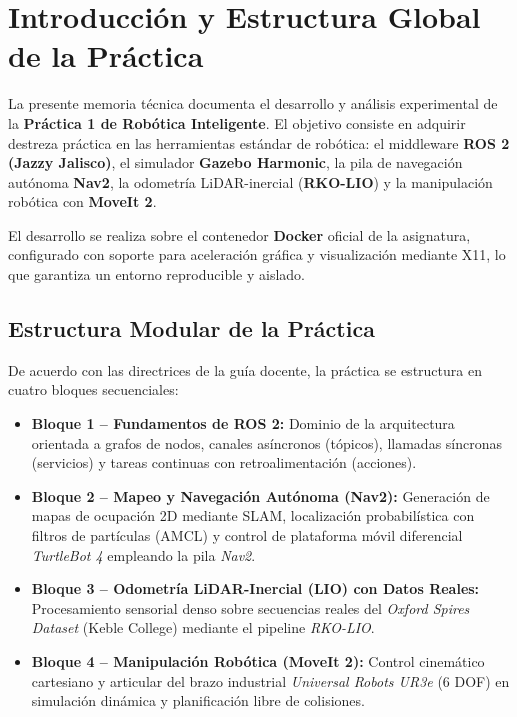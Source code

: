 \documentclass[11pt,a4paper]{article}
\begin{document}
\newpage
{}
\tableofcontents
\newpage
{}

\section{Introducción y Estructura Global de la Práctica}

La presente memoria técnica documenta el desarrollo y análisis experimental de la \textbf{Práctica 1 de Robótica Inteligente}. El objetivo consiste en adquirir destreza práctica en las herramientas estándar de robótica: el middleware \textbf{ROS 2 (Jazzy Jalisco)}, el simulador \textbf{Gazebo Harmonic}, la pila de navegación autónoma \textbf{Nav2}, la odometría LiDAR-inercial (\textbf{RKO-LIO}) y la manipulación robótica con \textbf{MoveIt 2}.

El desarrollo se realiza sobre el contenedor \textbf{Docker} oficial de la asignatura, configurado con soporte para aceleración gráfica y visualización mediante X11, lo que garantiza un entorno reproducible y aislado.

\subsection{Estructura Modular de la Práctica}
De acuerdo con las directrices de la guía docente, la práctica se estructura en cuatro bloques secuenciales:
\begin{itemize}
    \item \textbf{Bloque 1 -- Fundamentos de ROS 2:} Dominio de la arquitectura orientada a grafos de nodos, canales asíncronos (tópicos), llamadas síncronas (servicios) y tareas continuas con retroalimentación (acciones).
    \item \textbf{Bloque 2 -- Mapeo y Navegación Autónoma (Nav2):} Generación de mapas de ocupación 2D mediante SLAM, localización probabilística con filtros de partículas (AMCL) y control de plataforma móvil diferencial \textit{TurtleBot 4} empleando la pila \textit{Nav2}.
    \item \textbf{Bloque 3 -- Odometría LiDAR-Inercial (LIO) con Datos Reales:} Procesamiento sensorial denso sobre secuencias reales del \textit{Oxford Spires Dataset} (Keble College) mediante el pipeline \textit{RKO-LIO}.
    \item \textbf{Bloque 4 -- Manipulación Robótica (MoveIt 2):} Control cinemático cartesiano y articular del brazo industrial \textit{Universal Robots UR3e} (6 DOF) en simulación dinámica y planificación libre de colisiones.
\end{itemize}
\end{document}
